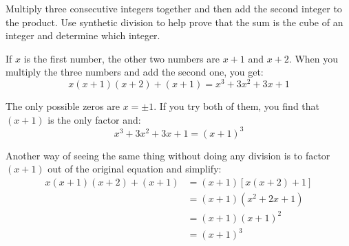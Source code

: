 \documentclass[fleqn,addpoints]{exam}
\begin{document}
\begin{questions}

    \bonusquestion[10]
      Multiply three consecutive integers together and then add the second integer to the product.  Use synthetic
      division to help prove that the sum is the cube of an integer and determine which integer.

      \begin{solution}
        If $x$ is the first number, the other two numbers are $x + 1$ and $x + 2$.  When you multiply the three
        numbers and add the second one, you get:
        \[
          x(x + 1)(x + 2) + (x + 1) = x^3 + 3x^2 + 3x + 1
        \]

        The only possible zeros are $x = \pm 1$.  If you try both of them, you find that $(x + 1)$ is the only
        factor and:
        \[
          x^3 + 3x^2 + 3x + 1 = (x + 1)^3
        \]

        Another way of seeing the same thing without doing any division is to factor $(x+1)$ out of the original
        equation and simplify:
        \begin{align*}
          x(x + 1)(x + 2) + (x + 1) &= (x+1) [ x(x+2) + 1 ] \\
                                    &= (x + 1) \left( x^2 + 2x + 1 \right) \\
                                    &= (x + 1) (x + 1)^2 \\
                                    &= (x + 1)^3 \\
        \end{align*}
        
      \end{solution}
  \end{questions}
\end{document}
